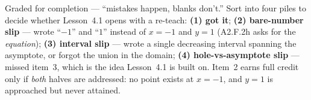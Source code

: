 \documentclass[10pt]{article}
\begin{document}
\begin{teachernote}
Graded for completion --- ``mistakes happen, blanks don't.'' Sort into four piles to decide whether
Lesson~4.1 opens with a re-teach: \textbf{(1) got it}; \textbf{(2) bare-number slip} --- wrote ``$-1$''
and ``$1$'' instead of $x=-1$ and $y=1$ (A2.F.2h asks for the \emph{equation}); \textbf{(3)
interval slip} --- wrote a single decreasing interval spanning the asymptote, or forgot the union in
the domain; \textbf{(4) hole-vs-asymptote slip} --- missed item~3, which is the idea Lesson~4.1 is
built on. Item~2 earns full credit only if \emph{both} halves are addressed: no point exists at
$x=-1$, and $y=1$ is approached but never attained.
\end{teachernote}
\end{document}
